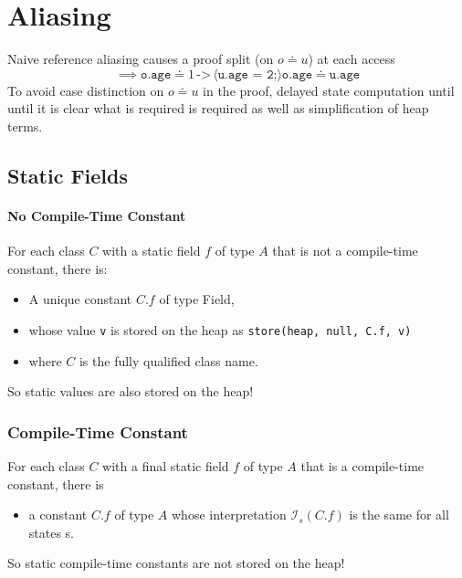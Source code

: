 \documentclass[a4paper, 11pt, accentcolor = tud3b]{tudreport}
\begin{document}
			\section{Aliasing}
				Naive reference aliasing causes a proof split (on \( o \doteq u \)) at each access
				\begin{equation*}
					\implies \texttt{o.age} \doteq 1 \,\texttt{->}\, \langle \texttt{u.age = 2;} \rangle \texttt{o.age} \doteq \texttt{u.age}
				\end{equation*}
				To avoid case distinction on \( o \doteq u \) in the proof, delayed state computation until until it is clear what is required is required as well as simplification of heap terms.
			
			\subsection{Static Fields}
				\paragraph{No Compile-Time Constant}
					For each class \(C\) with a static field \(f\) of type \(A\) that is not a compile-time constant, there is:
					\begin{itemize}
						\item A unique constant \( C.f \) of type Field,
						\item whose value \texttt{v} is stored on the heap as \texttt{store(heap, null, C.f, v)}
						\item where \(C\) is the fully qualified class name.
					\end{itemize}
					So static values are also stored on the heap!
				
				\subsubsection{Compile-Time Constant}
					For each class \(C\) with a final static field \(f\) of type \(A\) that is a compile-time constant, there is
					\begin{itemize}
						\item a constant \(C.f\) of type \(A\) whose interpretation \( \mathcal{I}_s(C.f) \) is the same for all states s.
					\end{itemize}
					So static compile-time constants are not stored on the heap!
			
\end{document}

